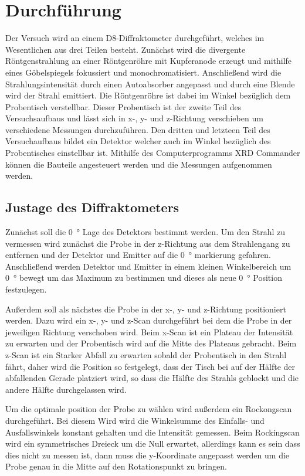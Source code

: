 \newpage
\section{Durchführung}
\label{sec:Durchfuehrung}
    Der Versuch wird an einem D8-Diffraktometer durchgeführt, welches im Wesentlichen aus drei Teilen besteht.
    Zunächst wird die divergente Röntgenstrahlung an einer Röntgenröhre mit Kupferanode erzeugt und mithilfe eines Göbelspiegels fokussiert und monochromatisiert.
    Anschließend wird die Strahlungsintensität durch einen Autoabsorber angepasst und durch eine Blende wird der Strahl emittiert.
    Die Röntgenröhre ist dabei im Winkel bezüglich dem Probentisch verstellbar.
    Dieser Probentisch ist der zweite Teil des Versuchsaufbaus und lässt sich in x-, y- und z-Richtung verschieben um verschiedene Messungen durchzuführen.
    Den dritten und letzteen Teil des Versuchaufbaus bildet ein Detektor welcher auch im Winkel bezüglich des Probentisches einstellbar ist.
    Mithilfe des Computerprogramms XRD Commander können die Bauteile angesteuert werden und die Messungen aufgenommen werden.

    \subsection{Justage des Diffraktometers}
        Zunächst soll die \SI{0}{\degree} Lage des Detektors bestimmt werden.
        Um den Strahl zu vermessen wird zunächst die Probe in der z-Richtung aus dem Strahlengang zu entfernen und der Detektor und Emitter auf die \SI{0}{\degree} markierung gefahren.
        Anschließend werden Detektor und Emitter in einem kleinen Winkelbereich um \SI{0}{\degree} bewegt um das Maximum zu bestimmen und dieses als neue \SI{0}{\degree} Position festzulegen.

        Außerdem soll als nächstes die Probe in der x-, y- und z-Richtung positioniert werden.
        Dazu wird ein x-, y- und z-Scan durchgeführt bei dem die Probe in der jeweiligen Richtung verschoben wird.
        Beim x-Scan ist ein Plateau der Intensität zu erwarten und der Probentisch wird auf die Mitte des Plateaus gebracht.
        Beim z-Scan ist ein Starker Abfall zu erwarten sobald der Probentisch in den Strahl fährt, daher wird die Position so festgelegt, dass der Tisch bei auf der Hälfte der abfallenden Gerade platziert wird, so dass die Hälfte des Strahls geblockt und die andere Hälfte durchgelassen wird.

        Um die optimale position der Probe zu wählen wird außerdem ein Rockongscan durchgeführt.
        Bei diesem Wird wird die Winkelsumme des Einfalls- und Ausfallswinkels konstant gehalten und die Intensität gemessen.
        Beim Rockingscan wird ein symmetrisches Dreieck um die Null erwartet, allerdings kann es sein dass dies nicht zu messen ist, dann muss die y-Koordinate angepasst werden um die Probe genau in die Mitte auf den Rotationspunkt zu bringen.

